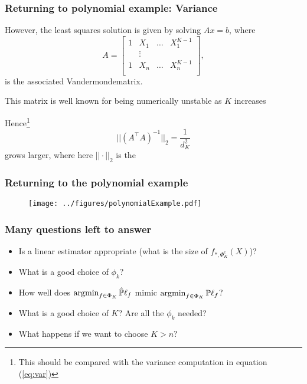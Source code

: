 \documentclass{beamer}
\begin{document}
\begin{frame}
\frametitle{Returning to polynomial example: Variance}
However, the least squares solution is given by solving $Ax = b$, where
\[
A =
\begin{bmatrix}
1 & X_1 & \ldots & X_1^{K-1} \\
   & \vdots && \\
 1 & X_n & \ldots & X_n^{K-1} \\
\end{bmatrix},
\]
is the associated Vandermonde\Note matrix. 

\vsp
This matrix is well known for being numerically unstable as $K$ increases 

\vsp 
Hence\footnote{This should be compared with the variance computation in equation (\ref{eq:var})}
\[
||(A^{\top}A)^{-1}||_2 = \frac{1}{d_K^2}
\]
grows larger, where here $||\cdot||_2$ is the \Note
\end{frame}

\begin{frame}
\frametitle{Returning to the polynomial example}
\begin{figure}
\centering
  \texttt{[image: ../figures/polynomialExample.pdf]}
\end{figure}
\end{frame}


\begin{frame}
\frametitle{Many questions left to answer}
\begin{itemize}
\item Is a linear estimator appropriate (what is the size of $f_{*,\Phi_K^c}(X)$)?
\item What is a good choice of $\phi_k$?
\item How well does $\operatorname*{\arg\!\min}_{f \in \Phi_K} \hat{\mathbb{P}}\ell_f$ mimic $\operatorname*{\arg\!\min}_{f \in \Phi_K} \mathbb{P}\ell_f$?
\item What is a good choice of $K$?  Are all the $\phi_k$ needed?
\item What happens if we want to choose $K > n$?
\end{itemize}

\end{frame}

\end{document}
